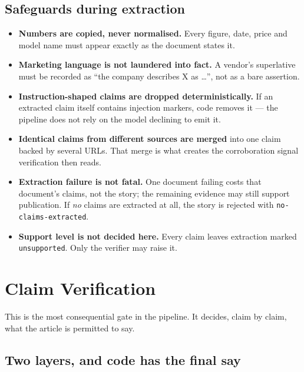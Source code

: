 \documentclass[11pt,a4paper]{article}
\newcommand{\brk}{\hyphenpenalty=0\exhyphenpenalty=0\relax}
\newcommand{\code}[1]{\texttt{\small\brk #1}}
\begin{document}
\subsection{Safeguards during extraction}

\begin{itemize}[leftmargin=1.2em,itemsep=0.25em]
  \item \textbf{Numbers are copied, never normalised.} Every figure, date, price
    and model name must appear exactly as the document states it.
  \item \textbf{Marketing language is not laundered into fact.} A vendor's
    superlative must be recorded as ``the company describes X as \ldots'', not as
    a bare assertion.
  \item \textbf{Instruction-shaped claims are dropped deterministically.} If an
    extracted claim itself contains injection markers, code removes it --- the
    pipeline does not rely on the model declining to emit it.
  \item \textbf{Identical claims from different sources are merged} into one claim
    backed by several URLs. That merge is what creates the corroboration signal
    verification then reads.
  \item \textbf{Extraction failure is not fatal.} One document failing costs that
    document's claims, not the story; the remaining evidence may still support
    publication. If \emph{no} claims are extracted at all, the story is rejected
    with \code{no-claims-extracted}.
  \item \textbf{Support level is not decided here.} Every claim leaves extraction
    marked \code{unsupported}. Only the verifier may raise it.
\end{itemize}

\section{Claim Verification}

This is the most consequential gate in the pipeline. It decides, claim by claim,
what the article is permitted to say.

\subsection{Two layers, and code has the final say}
\end{document}
